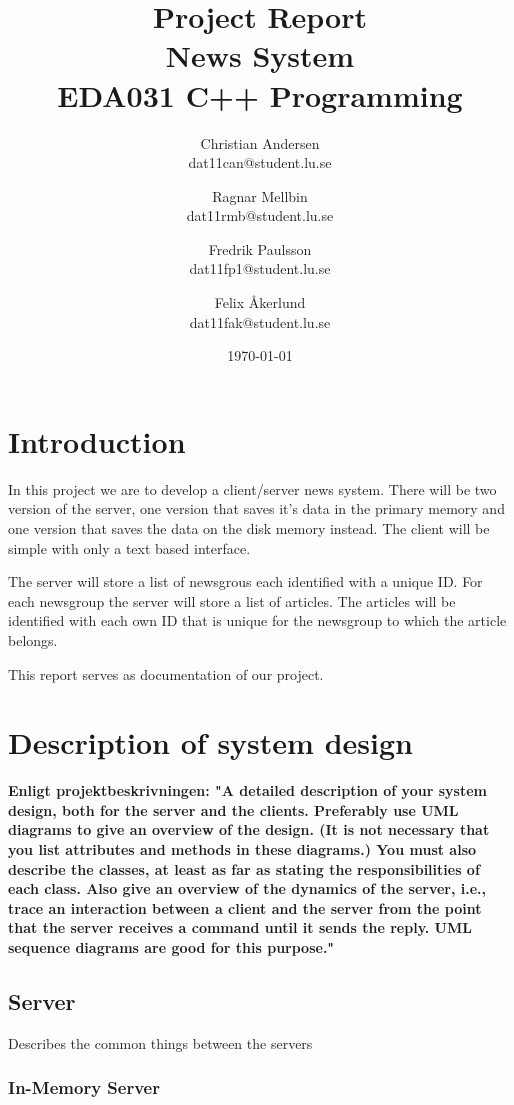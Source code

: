 \documentclass[a4paper]{article}
\title{Project Report \\ News System  \\ EDA031 C++ Programming}
\date{\today}
\author{Christian Andersen \\ dat11can@student.lu.se \and Ragnar Mellbin \\ dat11rmb@student.lu.se \and Fredrik Paulsson \\ dat11fp1@student.lu.se
\and Felix Åkerlund \\ dat11fak@student.lu.se}
\begin{document}
\maketitle


\section{Introduction}
In this project we are to develop a client/server news system. There will be two version of the server, one version that saves it's data in the primary memory and one version that saves the data on the disk memory instead. The client will be simple with only a text based interface.

The server will store a list of newsgrous each identified with a unique ID. For each newsgroup the server will store a list of articles. The articles will be identified with each own ID that is unique for the newsgroup to which the article belongs.

This report serves as documentation of our project.

\section{Description of system design}

\textbf{Enligt projektbeskrivningen: "A detailed description of your system design, both for the server and the clients. Preferably
use UML diagrams to give an overview of the design. (It is not necessary that you list
attributes and methods in these diagrams.) You must also describe the classes, at least as
far as stating the responsibilities of each class. Also give an overview of the dynamics of the server, i.e., trace an interaction between a
client and the server from the point that the server receives a command until it sends the
reply. UML sequence diagrams are good for this purpose."}

\subsection{Server}

Describes the common things between the servers

\subsubsection{In-Memory Server}
\end{document}
